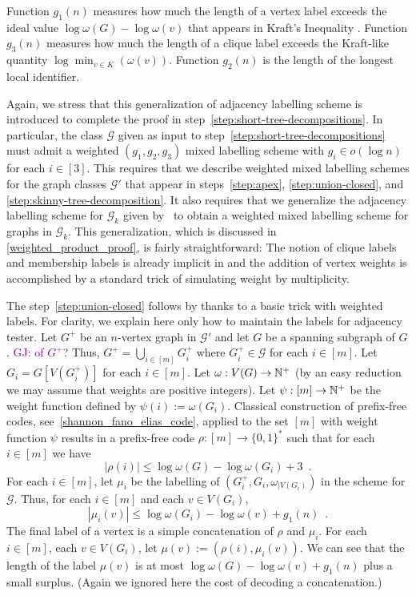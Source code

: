\documentclass{patmorin}
\renewcommand{\le}{\leqslant}
\newcommand{\gwen}[1]{\noindent\textcolor{Purple}{GJ: #1}}
\begin{document}
Function $g_1(n)$ measures how much the length of a vertex label exceeds the ideal value $\log \omega(G) - \log\omega(v)$ that appears in Kraft's Inequality \cite{Kraft1949}. Function $g_3(n)$ measures how much the length of a clique label exceeds the Kraft-like quantity $\log\min_{v\in K}(\omega(v))$.  Function $g_2(n)$ is the length of the longest local identifier.


Again, we stress that this generalization of adjacency labelling scheme is introduced to complete the proof in step~\ref{step:short-tree-decompositions}.  In particular, the class $\mathcal{G}$ given as input to step~\ref{step:short-tree-decompositions} must admit a weighted $(g_1,g_2,g_3)$ mixed labelling scheme with $g_i\in o(\log n)$ for each $i\in[3]$.  This requires that we describe weighted mixed labelling schemes for the graph classes $\mathcal{G}'$ that appear in steps~\ref{step:apex}, \ref{step:union-closed}, and \ref{step:skinny-tree-decomposition}.  It also requires that we generalize the adjacency labelling scheme for $\mathcal{G}_k$ given by~\citet{dujmovic.esperet.ea:adjacency} to obtain a weighted mixed labelling scheme for graphs in $\mathcal{G}_k$.
This generalization, which is discussed in \cref{weighted_product_proof}, is fairly straightforward: The notion of clique labels and membership labels is already implicit in \cite{dujmovic.esperet.ea:adjacency} and the addition of vertex weights is accomplished by a  standard trick of simulating weight by multiplicity.


The step~\ref{step:union-closed} follows by thanks to a basic trick with weighted labels.
For clarity, we explain here only how to maintain the labels for adjacency tester.
Let $G^+$ be an $n$-vertex graph in $\mathcal{G}'$ and let $G$ be a spanning subgraph of $G$. 
\gwen{of $G^+$?}
Thus,
$G^+=\bigcup_{i\in[m]}G^+_i$ where $G^+_i\in\mathcal{G}$ for each $i\in[m]$. 
Let $G_i=G[V(G^+_i)]$ for each $i\in[m]$. 
Let $\omega: V(G)\to\mathbb{N}^+$ (by an easy reduction we may assume that weights are positive integers). 
Let $\psi:[m]\to\mathbb{N}^+$ be the weight function defined by $\psi(i):=\omega(G_i)$. 
Classical construction of prefix-free codes, 
see~\cref{shannon_fano_elias_code}, applied to the set $[m]$ with weight function $\psi$ 
results in a prefix-free code $\rho:[m]\to\{0,1\}^*$ such that for each $i\in[m]$ we have
\[
|\rho(i)|\le\log \omega(G)-\log \omega(G_i)+3\enspace.
\]
For each $i\in[m]$, 
let $\mu_i$ be the labelling of $(G_i^+,G_i,\omega_{|V(G_i)})$ in the scheme for $\mathcal{G}$. 
Thus, for each $i\in[m]$ and each $v\in V(G_i)$,  
\[
|\mu_i(v)| \le \log\omega(G_i) - \log\omega(v) + g_1(n)\enspace.
\]
The final label of a vertex is a simple concatenation of $\rho$ and $\mu_i$. 
For each $i\in[m]$, each $v\in V(G_i)$, let 
$\mu(v):=(\rho(i),\mu_i(v))$. 
We can see that the length of the label $\mu(v)$ is at most $\log\omega(G)-\log\omega(v)+g_1(n)$ plus a small surplus. 
(Again we ignored here the cost of decoding a concatenation.) 
\end{document}

